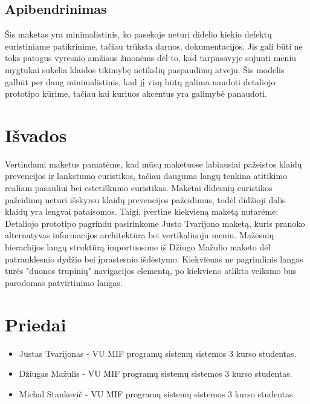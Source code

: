 \documentclass[oneside]{VUMIFPSkursinis}
\begin{document}
\subsection{Apibendrinimas}
Šis maketas yra minimalistinis, ko pasekoje neturi didelio kiekio defektų euristiniame patikrinime, tačiau trūksta darnos, dokumentacijos. Jis gali būti ne toks patogus vyresnio amžiaus žmonėms dėl to, kad tarpusavyje sujunti meniu mygtukai sukelia klaidos tikimybę netikslių paspaudimų atveju. Šis modelis galbūt per daug minimalistinis, kad jį visą būtų galima naudoti detaliojo prototipo kūrime, tačiau kai kuriuos akcentus yra galimybė panaudoti.
\section{Išvados}
Vertindami maketus pamatėme, kad mūsų maketuose labiausiai pažeistos klaidų prevencijos ir lankstumo euristikos, tačiau dauguma langų tenkina atitikimo realiam pasauliui bei estetiškumo euristikas. Maketai didesnių euristikos pažeidimų neturi išskyrsu klaidų prevencijos pažeidimus, todėl didžioji dalis klaidų yra lengvai pataisomos. Taigi, įvertine kiekvieną maketą nutarėme: \\
Detaliojo prototipo pagrindu pasirinkome Justo Tvarijono maketą, kuris pranoko alternatyvas informacijos architektūra bei vertikaliuoju meniu. Mažėsnių hierachijos langų struktūrą importuosime iš Džiugo Mažulio maketo dėl patrauklesnio dydžio bei įprastesnio išdėstymo.  Kiekvienas ne pagrindinis langas turės "duonos trupinių" navigacijos elementą, po kiekvieno atlikto veiksmo bus parodomas patvirtinimo langas.
\section{Priedai}
	\begin{itemize}
		\item Justas Tvarijonas - VU MIF programų sistemų sistemos 3 kurso studentas.
		\item Džiugas Mažulis - VU MIF programų sistemų sistemos 3 kurso studentas.
		\item Michal Stankevič - VU MIF programų sistemų sistemos 3 kurso studentas.
	\end{itemize}
\end{document}
